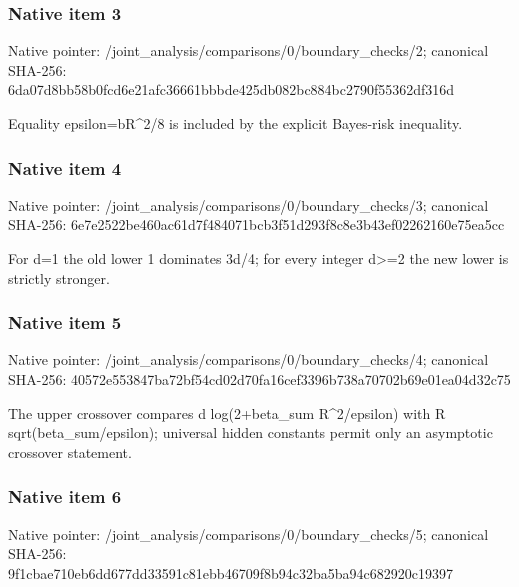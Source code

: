 \documentclass[10pt,a4paper]{article}
\begin{document}
\subsubsection{Native item 3}
Native pointer: /joint\_\allowbreak{}analysis/comparisons/0/boundary\_\allowbreak{}checks/2; canonical SHA-256: 6da07d8bb58b0fcd6e21afc36661bbbde425db082bc884bc2790f55362df316d

\begingroup\raggedright\sloppy Equality epsilon=\allowbreak{}bR\textasciicircum{}2/\allowbreak{}8 is included by the explicit Bayes-risk inequality.\par\endgroup

\subsubsection{Native item 4}
Native pointer: /joint\_\allowbreak{}analysis/comparisons/0/boundary\_\allowbreak{}checks/3; canonical SHA-256: 6e7e2522be460ac61d7f484071bcb3f51d293f8c8e3b43ef02262160e75ea5cc

\begingroup\raggedright\sloppy For d=\allowbreak{}1 the old lower 1 dominates 3d/\allowbreak{}4;\allowbreak{} for every integer d>=\allowbreak{}2 the new lower is strictly stronger.\par\endgroup

\subsubsection{Native item 5}
Native pointer: /joint\_\allowbreak{}analysis/comparisons/0/boundary\_\allowbreak{}checks/4; canonical SHA-256: 40572e553847ba72bf54cd02d70fa16cef3396b738a70702b69e01ea04d32c75

\begingroup\raggedright\sloppy The upper crossover compares d log(2+beta\_\allowbreak{}sum R\textasciicircum{}2/\allowbreak{}epsilon) with R sqrt(beta\_\allowbreak{}sum/\allowbreak{}epsilon);\allowbreak{} universal hidden constants permit only an asymptotic crossover statement.\par\endgroup

\subsubsection{Native item 6}
Native pointer: /joint\_\allowbreak{}analysis/comparisons/0/boundary\_\allowbreak{}checks/5; canonical SHA-256: 9f1cbae710eb6dd677dd33591c81ebb46709f8b94c32ba5ba94c682920c19397
\end{document}
